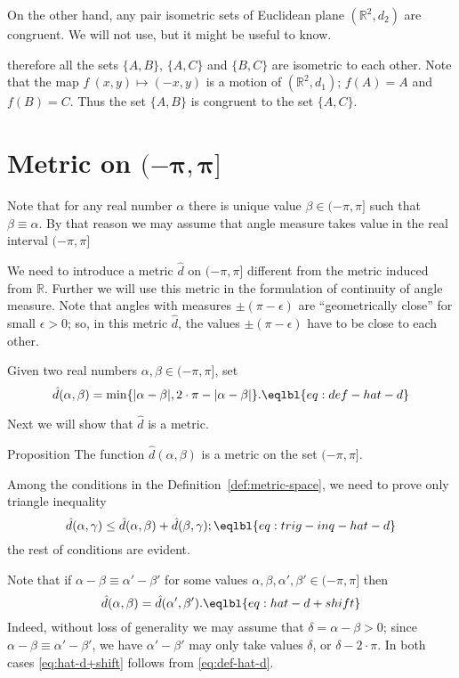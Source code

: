 On the other hand,
any pair isometric sets of Euclidean plane $(\mathbb{R}^2,d_2)$ are congruent.
We will not use, but it might be useful to know.



therefore all the sets $\{A,B\}$, $\{A,C\}$ and $\{B,C\}$ are isometric to each other.
Note that the map $f\:(x,y)\mapsto (-x,y)$ is a motion of $(\mathbb{R}^2,d_1)$; 
$f(A)=A$ and $f(B)=C$.
Thus the set $\{A,B\}$ is congruent to the set $\{A,C\}$.









\section*{Metric on $\bm{(-\pi,\pi]}$}
\addtocontents{toc}{Metric on $(-\pi,\pi]$.}

Note that for any real number $\alpha$ there is unique value $\beta\in(-\pi,\pi]$ such that
$\beta\equiv \alpha$.
By that reason we may assume that angle measure takes value in the real interval $(-\pi,\pi]$

We need to introduce a metric $\hat{d}$ on $(-\pi,\pi]$
different from the metric induced from $\mathbb{R}$.
Further we will use this metric in the formulation 
of continuity of angle measure.
Note that angles with measures $\pm(\pi-\epsilon)$ are ``geometrically close'' for small $\epsilon>0$;
so, in this metric $\hat{d}$, the values $\pm(\pi-\epsilon)$ have to be close to each other.

Given two real numbers 
$\alpha,\beta\in (-\pi,\pi]$,
set \label{def:max-dist}
$$\hat{d}(\alpha,\beta)
=
\min\{|\alpha-\beta|,2\cdot\pi-|\alpha-\beta|\}.
\eqlbl{eq:def-hat-d}
$$

Next we will show that $\hat{d}$ is a metric.

\begin{thm}{Proposition}
The function $\hat{d}(\alpha,\beta)$ is a metric on the set $(-\pi,\pi]$.
\end{thm}

Among the conditions in the Definition~\ref{def:metric-space}, we need to prove only triangle inequality
$$\hat{d}(\alpha,\gamma)\le \hat{d}(\alpha,\beta)+\hat{d}(\beta,\gamma);
\eqlbl{eq:trig-inq-hat-d}$$
the rest of conditions are  evident.

Note that if $\alpha-\beta\equiv \alpha'-\beta'$
for some values 
$\alpha,\beta,\alpha',\beta'\in (-\pi,\pi]$
then 
$$\hat{d}(\alpha,\beta)
=
\hat{d}(\alpha',\beta').
\eqlbl{eq:hat-d+shift}$$
Indeed, without loss of generality we may assume that $\delta=\alpha-\beta>0$;
since $\alpha-\beta\equiv \alpha'-\beta'$,
we have $\alpha'-\beta'$ may only take  values $\delta$, or $\delta-2\cdot\pi $.
In both cases \ref{eq:hat-d+shift} follows from \ref{eq:def-hat-d}.

